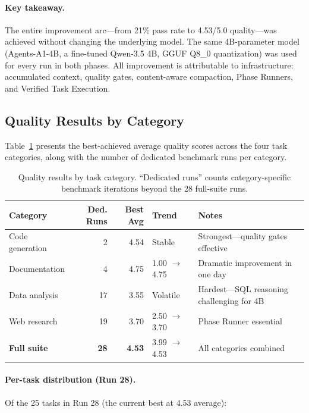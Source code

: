 \documentclass{article}
\begin{document}
\paragraph{Key takeaway.}
The entire improvement arc---from 21\% pass rate to 4.53/5.0 quality---was achieved without changing the underlying model.
The same 4B-parameter model (Agents-A1-4B, a fine-tuned Qwen-3.5 4B, GGUF Q8\_0 quantization) was used for every run in both phases.
All improvement is attributable to infrastructure: accumulated context, quality gates, content-aware compaction, Phase Runners, and Verified Task Execution.

\subsection{Quality Results by Category}
\label{sec:eval_category_results}

Table~\ref{tab:category_results} presents the best-achieved average quality scores across the four task categories, along with the number of dedicated benchmark runs per category.

\begin{table}[h]
\centering
\caption{Quality results by task category. ``Dedicated runs'' counts category-specific benchmark iterations beyond the 28 full-suite runs.}
\label{tab:category_results}
\small
\begin{tabular}{@{}lrrll@{}}
\toprule
\textbf{Category} & \textbf{Ded. Runs} & \textbf{Best Avg} & \textbf{Trend} & \textbf{Notes} \\
\midrule
Code generation & 2 & 4.54 & Stable & Strongest---quality gates effective \\
Documentation & 4 & 4.75 & 1.00 $\to$ 4.75 & Dramatic improvement in one day \\
Data analysis & 17 & 3.55 & Volatile & Hardest---SQL reasoning challenging for 4B \\
Web research & 19 & 3.70 & 2.50 $\to$ 3.70 & Phase Runner essential \\
\midrule
\textbf{Full suite} & \textbf{28} & \textbf{4.53} & 3.99 $\to$ 4.53 & All categories combined \\
\bottomrule
\end{tabular}
\end{table}

\paragraph{Per-task distribution (Run 28).}
Of the 25 tasks in Run 28 (the current best at 4.53 average):
\end{document}
